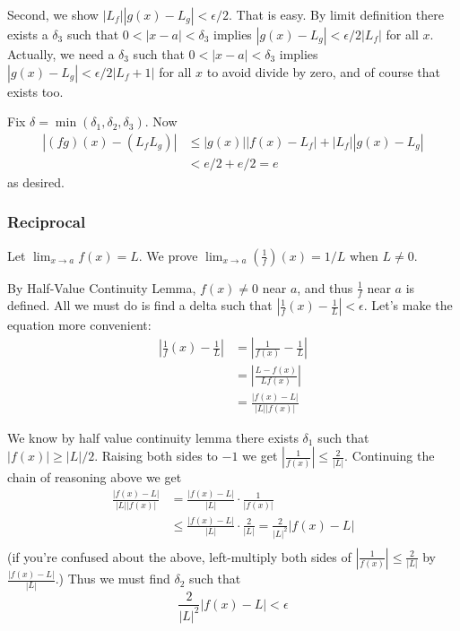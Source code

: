 \vs

Second, we show $|L_f||g(x)-L_g|<\epsilon/2$. That is easy. By limit definition there exists a $\delta_3$ such that $0<|x-a|<\delta_3$ implies $|g(x)-L_g|<\epsilon/2|L_f|$ for all $x$. Actually, we need a $\delta_3$ such that $0<|x-a|<\delta_3$ implies $|g(x)-L_g|<\epsilon/2|L_f+1|$ for all $x$ to avoid divide by zero, and of course that exists too.

\vs

Fix $\delta=\min(\delta_1, \delta_2, \delta_3)$. Now
\begin{align*}
    |(fg)(x)-(L_fL_g)|&\leq |g(x)||f(x)-L_f|+|L_f||g(x)-L_g|\\
    &<e/2+e/2=e
\end{align*}
as desired.

\subsubsection{Reciprocal}
Let $\lim_{x\to a}f(x)=L$. We prove $\lim_{x\to a}\left(\frac{1}{f}\right)(x)=1/L$ when $L\neq 0$.

\vs

By Half-Value Continuity Lemma, $f(x)\neq 0$ near $a$, and thus $\frac{1}{f}$ near $a$ is defined. All we must do is find a delta such that $\left|\frac{1}{f}(x)-\frac{1}{L}\right|<\epsilon$. Let's make the equation more convenient:
\begin{align*}
    \left|\frac{1}{f}(x)-\frac{1}{L}\right|&=\left|\frac{1}{f(x)}-\frac{1}{L}\right|\\
    &=\left|\frac{L-f(x)}{Lf(x)}\right|\\
    &=\frac{|f(x)-L|}{|L||f(x)|}
\end{align*}

We know by half value continuity lemma there exists $\delta_1$ such that $|f(x)|\geq |L|/2$. Raising both sides to $-1$ we get $|\frac{1}{f(x)}|\leq \frac{2}{|L|}$. Continuing the chain of reasoning above we get
\begin{align*}
    \frac{|f(x)-L|}{|L||f(x)|}&=\frac{|f(x)-L|}{|L|}\cdot\frac{1}{|f(x)|}\\
    &\leq\frac{|f(x)-L|}{|L|}\cdot\frac{2}{|L|}=\frac{2}{|L|^2}|f(x)-L|\\
\end{align*}
(if you're confused about the above, left-multiply both sides of $|\frac{1}{f(x)}|\leq \frac{2}{|L|}$ by $\frac{|f(x)-L|}{|L|}$.) Thus we must find $\delta_2$ such that
\[\frac{2}{|L|^2}|f(x)-L|<\epsilon\]

